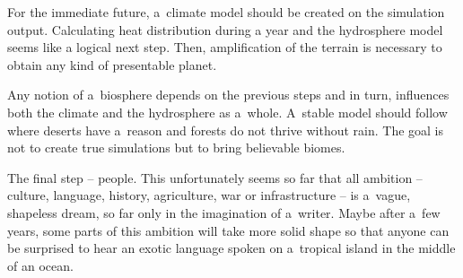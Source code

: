 For the immediate future, a~climate model should be created on the simulation output. Calculating heat distribution during a year and the hydrosphere model seems like a logical next step. Then, amplification of the terrain is necessary to obtain any kind of presentable planet.

Any notion of a~biosphere depends on the previous steps and in turn, influences both the climate and the hydrosphere as a~whole. A~stable model should follow where deserts have a~reason and forests do not thrive without rain. The goal is not to create true simulations but to bring believable biomes.

The final step -- people. This unfortunately seems so far that all ambition -- culture, language, history, agriculture, war or infrastructure -- is a~vague, shapeless dream, so far only in the imagination of a~writer. Maybe after a~few years, some parts of this ambition will take more solid shape so that anyone can be surprised to hear an exotic language spoken on a~tropical island in the middle of an ocean.